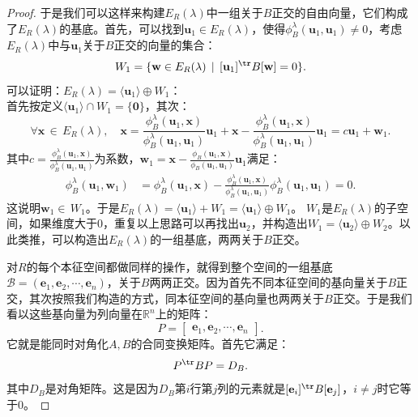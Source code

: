 \documentclass[12pt,UTF8]{ctexbook}
\begin{document}
\begin{appendix}
\begin{proof}
    于是我们可以这样来构建$E_R(\lambda)$中一组关于$B$正交的自由向量，它们构成了$E_R(\lambda)$的基底。首先，可以找到$\mathbf{u}_1 \in E_R(\lambda)$，使得$\phi_B^{\lambda}(\mathbf{u}_1, \mathbf{u}_1)\neq 0$，考虑$E_R(\lambda)$中与$\mathbf{u}_1$关于$B$正交的向量的集合：
    $$ W_1 = \{\mathbf{w}\in E_R(\lambda)\, \mid \, [\mathbf{u}_1]^{\tr}B[\mathbf{w}] = 0\}. $$
    可以证明：$E_R(\lambda) = \langle\mathbf{u}_1\rangle \oplus W_1$：\\
    首先按定义$\langle\mathbf{u}_1\rangle\cap W_1 = \{\mathbf{0}\}$，其次：
    $$ \forall \mathbf{x} \, \in \, E_R(\lambda), \quad \mathbf{x} = \frac{\phi_B^{\lambda}(\mathbf{u}_1,\mathbf{x})}{\phi_B^{\lambda}(\mathbf{u}_1,\mathbf{u}_1)}\mathbf{u}_1 + \mathbf{x} -\frac{\phi_B^{\lambda}(\mathbf{u}_1,\mathbf{x})}{\phi_B^{\lambda}(\mathbf{u}_1,\mathbf{u}_1)}\mathbf{u}_1 = c\mathbf{u}_1 + \mathbf{w}_1.
    $$
    其中$c = \frac{\phi_B^{\lambda}(\mathbf{u}_1,\mathbf{x})}{\phi_B^{\lambda}(\mathbf{u}_1,\mathbf{u}_1)}$为系数，$\mathbf{w}_1 = \mathbf{x} - \frac{\phi_B(\mathbf{u}_1,\mathbf{x})}{\phi_B(\mathbf{u}_1,\mathbf{u}_1)}\mathbf{u}_1$满足：
    \begin{align*}
        \phi_B^{\lambda}(\mathbf{u}_1, \mathbf{w}_1) &= \phi_B^{\lambda}(\mathbf{u}_1, \mathbf{x}) - \frac{\phi_B^{\lambda}(\mathbf{u}_1,\mathbf{x})}{\phi_B^{\lambda}(\mathbf{u}_1,\mathbf{u}_1)} \phi_B^{\lambda}(\mathbf{u}_1,\mathbf{u}_1) = 0.
    \end{align*}
    这说明$\mathbf{w}_1\in \, W_1$。于是$E_R(\lambda) = \langle\mathbf{u}_1\rangle + W_1 = \langle\mathbf{u}_1\rangle \oplus W_1$。
    $W_1$是$E_R(\lambda)$的子空间，如果维度大于$0$，重复以上思路可以再找出$\mathbf{u}_2$，并构造出$W_1 = \langle\mathbf{u}_2\rangle \oplus W_2$。以此类推，可以构造出$E_R(\lambda)$的一组基底，两两关于$B$正交。

    对$R$的每个本征空间都做同样的操作，就得到整个空间的一组基底$\mathcal{B} = (\mathbf{e}_1, \mathbf{e}_2, \cdots, \mathbf{e}_n)$，关于$B$两两正交。因为首先不同本征空间的基向量关于$B$正交，其次按照我们构造的方式，同本征空间的基向量也两两关于$B$正交。于是我们看以这些基向量为列向量在$\mathbb{R}^n$上的矩阵：
    $$ P = \begin{bmatrix}
        \mathbf{e}_1, \mathbf{e}_2, \cdots, \mathbf{e}_n
    \end{bmatrix}.$$
    它就是能同时对角化$A,B$的合同变换矩阵。首先它满足：
    $$ P^{\tr} BP = D_B.$$
    其中$D_B$是对角矩阵。这是因为$D_B$第$i$行第$j$列的元素就是$[\mathbf{e}_i]^{\tr}B[\mathbf{e}_j]$，$i\neq j$时它等于$0$。


\end{proof}
\end{appendix}
\end{document}
